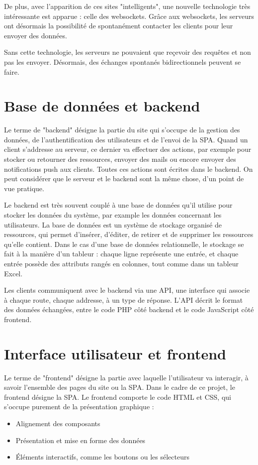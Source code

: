 \documentclass[
    iai, %
    eai, %
]{heig-tb}
\begin{document}
\newpage
De plus, avec l'apparition de ces sites "intelligents", une nouvelle technologie très intéressante est apparue : celle des websockets.
Grâce aux websockets, les serveurs ont désormais la possibilité de spontanément contacter les clients pour leur envoyer des données.

Sans cette technologie, les serveurs ne pouvaient que reçevoir des requêtes et non pas les envoyer.
Désormais, des échanges spontanés bidirectionnels peuvent se faire.

\section{Base de données et backend}
Le terme de "backend" désigne la partie du site qui s'occupe de la gestion des données, de l'authentification des utilisateurs et de l'envoi de la SPA.
Quand un client s'addresse au serveur, ce dernier va effectuer des actions, par exemple pour stocker ou retourner des ressources, envoyer des mails ou encore envoyer des notifications push aux clients. Toutes ces actions sont écrites dans le backend. On peut considérer que le serveur et le backend sont la même chose, d'un point de vue pratique.

Le backend est très souvent couplé à une base de données qu'il utilise pour stocker les données du système, par example les données concernant les utilisateurs.
La base de données est un système de stockage organisé de ressources, qui permet d'insérer, d'éditer, de retirer et de supprimer les ressources qu'elle contient.
Dans le cas d'une base de données relationnelle, le stockage se fait à la manière d'un tableur : chaque ligne représente une entrée, et chaque entrée possède des attributs rangés en colonnes, tout comme dans un tableur Excel.

Les clients communiquent avec le backend via une API, une interface qui associe à chaque route, chaque addresse, à un type de réponse.
L'API décrit le format des données échangées, entre le code PHP côté backend et le code JavaScript côté frontend.

\newpage

\section{Interface utilisateur et frontend}
Le terme de "frontend" désigne la partie avec laquelle l'utilisateur va interagir, à savoir l'ensemble des pages du site ou la SPA. Dans le cadre de ce projet, le frontend désigne la SPA.
Le frontend comporte le code HTML et CSS, qui s'occupe purement de la présentation graphique :
\begin{itemize}
  \item Alignement des composants
  \item Présentation et mise en forme des données
  \item Éléments interactifs, comme les boutons ou les sélecteurs
\end{itemize}
\bigskip
\end{document}
